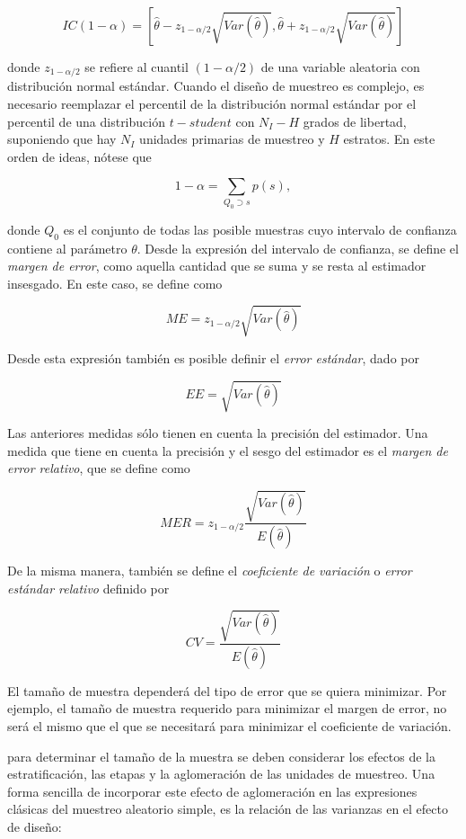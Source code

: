 \documentclass[
  12pt,
]{book}
\begin{document}
\[
IC(1-\alpha)=\left[\hat{\theta}-z_{1-\alpha / 2}\sqrt{ Var(\hat{\theta})},\hat{\theta}+z_{1-\alpha / 2}\sqrt{Var(\hat{\theta})}\right]
\]

donde \(z_{1-\alpha / 2}\) se refiere al cuantil \((1-\alpha / 2)\) de una variable aleatoria con distribución normal estándar. Cuando el diseño de muestreo es complejo, es necesario reemplazar el percentil de la distribución normal estándar por el percentil de una distribución \(t-student\) con \(N_I - H\) grados de libertad, suponiendo que hay \(N_I\) unidades primarias de muestreo y \(H\) estratos. En este orden de ideas, nótese que

\[
1-\alpha=\sum_{Q_0 \supset s}p(s),
\]

donde \(Q_0\) es el conjunto de todas las posible muestras cuyo intervalo de confianza contiene al parámetro \(\theta\). Desde la expresión del intervalo de confianza, se define el \emph{margen de error}, como aquella cantidad que se suma y se resta al estimador insesgado. En este caso, se define como

\[
ME = z_{1-\alpha / 2}\sqrt{ Var(\hat{\theta})}
\]

Desde esta expresión también es posible definir el \emph{error estándar}, dado por

\[
EE = \sqrt{ Var(\hat{\theta})}
\]

Las anteriores medidas sólo tienen en cuenta la precisión del estimador. Una medida que tiene en cuenta la precisión y el sesgo del estimador es el \emph{margen de error relativo}, que se define como

\[
MER = z_{1-\alpha / 2}\frac{\sqrt{ Var(\hat{\theta})}}{E(\hat{\theta})}
\]

De la misma manera, también se define el \emph{coeficiente de variación} o \emph{error estándar relativo} definido por

\[
CV =  \frac{\sqrt{ Var(\hat{\theta})}}{E(\hat{\theta})}
\]

El tamaño de muestra dependerá del tipo de error que se quiera minimizar. Por ejemplo, el tamaño de muestra requerido para minimizar el margen de error, no será el mismo que el que se necesitará para minimizar el coeficiente de variación.

para determinar el tamaño de la muestra se deben considerar los efectos de la estratificación, las etapas y la aglomeración de las unidades de muestreo. Una forma sencilla de incorporar este efecto de aglomeración en las expresiones clásicas del muestreo aleatorio simple, es la relación de las varianzas en el efecto de diseño:
\end{document}
